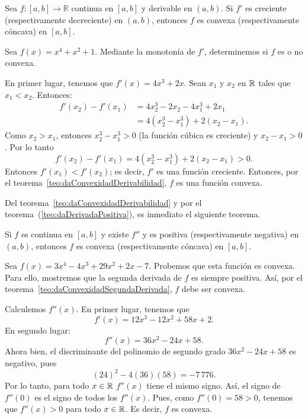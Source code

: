 \begin{teocal}\label{teo:daConvexidadDerivabilidad}
Sea $f\colon [a,b] \rightarrow \mathbb{R}$ continua en $[a,b]$ y derivable en $(a,b)$. Si $f'$ es
creciente (respectivamente decreciente) en $(a,b)$, entonces $f$ es convexa (respectivamente
cóncava) en $[a,b]$.
\end{teocal}

\begin{exemplo}[]{}
Sea $f(x) = x^4 + x^2 + 1$. Mediante la monotonía de $f'$, determinemos si $f$ es o no convexa.

En primer lugar, tenemos que $f'(x) = 4x^3 + 2x$. Sean $x_1$ y $x_2$ en $\mathbb{R}$ tales que $x_1 <
x_2$. Entonces:
\begin{align*}
f'(x_2) - f'(x_1) &= 4x_2^3 - 2x_2 - 4x_1^3 + 2x_1 \\
                  &= 4(x_2^3 - x_1^3) + 2(x_2 - x_1).
\end{align*}
Como $x_2 > x_1$, entonces $x_2^3 - x_1^3 > 0$ (la función cúbica es creciente) y $x_2 - x_1 > 0$.
Por lo tanto
\[
f'(x_2) - f'(x_1) = 4(x_2^3 - x_1^3) + 2(x_2 - x_1) > 0.
\]
Entonces $f'(x_1) < f'(x_2)$; es decir, $f'$ es una función creciente. Entonces, por el
teorema~\ref{teo:daConvexidadDerivabilidad}, $f$ es una función convexa.
\end{exemplo}

Del teorema~\ref{teo:daConvexidadDerivabilidad} y por el teorema~(\ref{teo:daDerivadaPositiva}), es
inmediato el siguiente teorema.

\begin{teocal}\label{teo:daConvexidadSegundaDerivada}
Si $f$ es continua en $[a,b]$ y existe $f''$ y es positiva (respectivamente negativa) en $(a,b)$,
entonces $f$ es convexa (respectivamente cóncava) en $[a,b]$.
\end{teocal}

\begin{exemplo}[]{}
Sea $f(x) = 3x^4 - 4x^3 + 29x^2 + 2x - 7$. Probemos que esta función es convexa. Para ello,
mostremos que la segunda derivada de $f$ es siempre positiva. Así, por el
teorema~\ref{teo:daConvexidadSegundaDerivada}, $f$ debe ser convexa.

Calculemos $f''(x)$. En primer lugar, tenemos que
\[
  f'(x) = 12x^3 - 12x^2 + 58x + 2.
\]
En segundo lugar:
\[
  f''(x) = 36x^2 - 24x + 58.
\]
Ahora bien, el discriminante del polinomio de segundo grado $36x^2 - 24x + 58$ es negativo, pues
\[
(24)^2 - 4(36)(58) = -7\,776.
\]
Por lo tanto, para todo $x\in\mathbb{R}$ $f''(x)$ tiene el mismo signo. Así, el signo de $f''(0)$ es el
signo de todos los $f''(x)$. Pues, como $f''(0) = 58 > 0$, tenemos que $f''(x) > 0$ para todo
$x\in\mathbb{R}$. Es decir, $f$ es convexa.
\end{exemplo}


